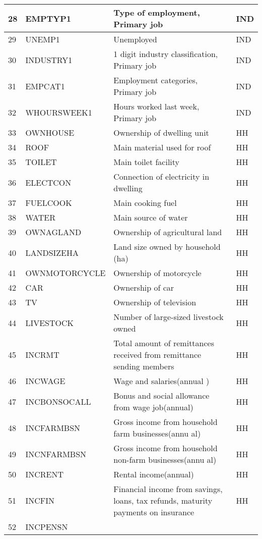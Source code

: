 \documentclass[letterpaper,10pt,english]{sphinxmanual}
\begin{document}
\begin{savenotes}
\begin{longtable}{|l|l|l|l|}
\\
\hline
28
&
EMPTYP1
&
Type of
employment,
Primary job
&
IND
\\
\hline
29
&
UNEMP1
&
Unemployed
&
IND
\\
\hline
30
&
INDUSTRY1
&
1 digit
industry
classification,
Primary job
&
IND
\\
\hline
31
&
EMPCAT1
&
Employment
categories,
Primary job
&
IND
\\
\hline
32
&
WHOURSWEEK1
&
Hours worked
last week,
Primary job
&
IND
\\
\hline
33
&
OWNHOUSE
&
Ownership of
dwelling unit
&
HH
\\
\hline
34
&
ROOF
&
Main material
used for roof
&
HH
\\
\hline
35
&
TOILET
&
Main toilet
facility
&
HH
\\
\hline
36
&
ELECTCON
&
Connection of
electricity in
dwelling
&
HH
\\
\hline
37
&
FUELCOOK
&
Main cooking
fuel
&
HH
\\
\hline
38
&
WATER
&
Main source of
water
&
HH
\\
\hline
39
&
OWNAGLAND
&
Ownership of
agricultural
land
&
HH
\\
\hline
40
&
LANDSIZEHA
&
Land size owned
by household
(ha)
&
HH
\\
\hline
41
&
OWNMOTORCYCLE
&
Ownership of
motorcycle
&
HH
\\
\hline
42
&
CAR
&
Ownership of
car
&
HH
\\
\hline
43
&
TV
&
Ownership of
television
&
HH
\\
\hline
44
&
LIVESTOCK
&
Number of
large-sized
livestock owned
&
HH
\\
\hline
45
&
INCRMT
&
Total amount of
remittances
received from
remittance
sending members
&
HH
\\
\hline
46
&
INCWAGE
&
Wage and
salaries(annual
)
&
HH
\\
\hline
47
&
INCBONSOCALL
&
Bonus and
social
allowance from
wage
job(annual)
&
HH
\\
\hline
48
&
INCFARMBSN
&
Gross income
from household
farm
businesses(annu
al)
&
HH
\\
\hline
49
&
INCNFARMBSN
&
Gross income
from household
non-farm
businesses(annu
al)
&
HH
\\
\hline
50
&
INCRENT
&
Rental
income(annual)
&
HH
\\
\hline
51
&
INCFIN
&
Financial
income from
savings, loans,
tax refunds,
maturity
payments on
insurance
&
HH
\\
\hline
52
&
INCPENSN

\end{longtable}
\end{savenotes}
\end{document}
